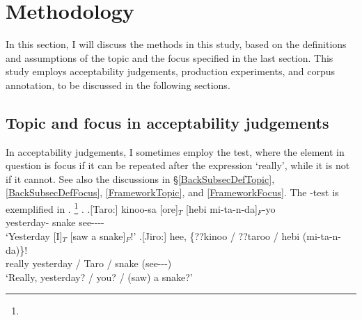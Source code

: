 \section{Methodology}\label{FrameworkTFIdent}

In this section,
I will discuss the methods in this study,
based on the definitions and assumptions of the topic and the focus specified in the last section.
This study employs acceptability judgements,
production experiments, and
corpus annotation,
to be discussed in the following sections.

\subsection{Topic and focus in acceptability judgements}

In acceptability judgements,
I sometimes employ the  test,
where the element in question is focus if it can be repeated after the expression  `really',
while it is not if it cannot.
See also the discussions in \S \ref{BackSubsecDefTopic}, \ref{BackSubsecDefFocus}, \ref{FrameworkTopic}, and \ref{FrameworkFocus}.
The -test is exemplified in \Next.%
 \footnote{
 }
\ex.\label{Fr:Method:Ex:Hebi} \ag.[Taro:] kinoo-sa [ore]$_{T}$ [hebi mi-ta-n-da]$_{F}$-yo \\
		yesterday-  snake see---- \\
	`Yesterday [I]$_{T}$ [saw a snake]$_{F}$!'
	\bg.[Jiro:] hee, \{??kinoo / ??taroo / hebi (mi-ta-n-da)\}! \\
			really yesterday / Taro / snake (see---) \\
			`Really, yesterday? / you? / (saw) a snake?'


